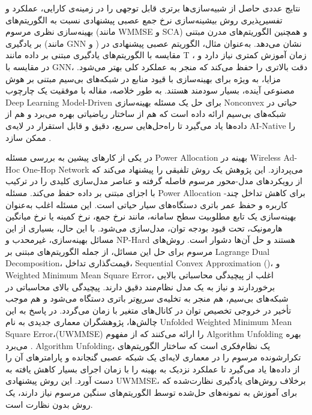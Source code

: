 نتایج عددی حاصل از شبیه‌سازی‌ها برتری قابل توجهی را در زمینه‌ی کارایی، عملکرد و تفسیرپذیری روش بیشینه‌سازی نرخ جمع عصبی پیشنهادی نسبت به الگوریتم‌های بهینه‌سازی نظری مرسوم (مانند 
\gls{WMMSE}
 و 
\gls{SCA})
 و همچنین الگوریتم‌های مدرن مبتنی بر یادگیری (مانند 
\gls{GNN}
  و 
)
 نشان می‌دهد. به‌عنوان مثال، الگوریتم عصبی پیشنهادی در مقایسه با الگوریتم‌های یادگیری مبتنی بر داده مانند T
،
   زمان آموزش کمتری نیاز دارد و در مقایسه با 
\gls{GNN}،
    دقت بالاتری را حفظ می‌کند که منجر به عملکرد کلی بهتر می‌شود.  مزایا، به ویژه برای بهینه‌سازی با قیود منابع در شبکه‌های بی‌سیم مبتنی بر هوش مصنوعی آینده، بسیار سودمند هستند.
به طور خلاصه،  مقاله با موفقیت یک چارچوب 
\gls{Deep Learning}
\gls{Model-Driven}
 برای حل یک مسئله بهینه‌سازی 
\gls{Nonconvex}
  حیاتی در شبکه‌های بی‌سیم ارائه داده است که هم از ساختار ریاضیاتی بهره می‌برد و هم از داده‌ها یاد می‌گیرد تا راه‌حل‌هایی سریع، دقیق و قابل استقرار در لایه‌ی AI-Native را ممکن سازد
\cite{NeuralSumRate}.

در یکی از کارهای پیشین به بررسی مسئله 
\gls{Power Allocation}
 بهینه در  
\gls{Wireless Ad-Hoc One-Hop Network}
  می‌پردازد. این پژوهش یک روش تلفیقی را پیشنهاد می‌کند که از رویکردهای مدل-محور مرسوم فاصله گرفته و عناصر مدل‌سازی کلیدی را در ترکیب با اجزای مبتنی بر داده حفظ می‌کند.
	مسئله 
\gls{Power Allocation}
	برای کاهش تداخل چند-کاربره و حفظ عمر باتری دستگاه‌های سیار حیاتی است. این مسئله اغلب به‌عنوان بهینه‌سازی یک تابع مطلوبیت سطح سامانه، مانند نرخ جمع، نرخ کمینه یا نرخ میانگین هارمونیک، تحت قیود بودجه توان، مدل‌سازی می‌شود. با این حال، بسیاری از این مسائل بهینه‌سازی، غیرمحدب و NP-Hard هستند و حل آن‌ها دشوار است. روش‌های مرسوم برای حل این مسائل، از جمله الگوریتم‌های مبتنی بر 
\gls{Lagrange Dual Decomposition}،
 قیمت‌گذاری تداخل، 
\gls{Sequential Convex Approximation} ()،
  و 
\gls{Weighted Minimum Mean Square Error}،
   اغلب از پیچیدگی محاسباتی بالایی برخوردارند و نیاز به یک مدل ‌نظام‌مند دقیق دارند. پیچیدگی بالای محاسباتی در شبکه‌های بی‌سیم، هم منجر به تخلیه‌ی سریع‌تر باتری دستگاه می‌شود و هم موجب تأخیر در خروجی تخصیص توان در کانال‌های متغیر با زمان می‌گردد.
	در پاسخ به این چالش‌ها، پژوهشگران معماری جدیدی به نام 
\gls{Unfolded Weighted Minimum Mean Square Error}،(UWMMSE)
	 را ارائه می‌کنند که از مفهوم 
\gls{Algorithm Unfolding}
 بهره می‌برد . 
\gls{Algorithm Unfolding}،
  یک نظام‌فکری است که ساختار الگوریتم‌های تکرارشونده مرسوم را در معماری لایه‌ای یک شبکه عصبی گنجانده و پارامترهای آن را از داده‌ها یاد می‌گیرد تا عملکرد نزدیک به بهینه را با زمان اجرای بسیار کاهش یافته به دست آورد. این روش پیشنهادی 
\gls{UWMMSE}،
   برخلاف روش‌های یادگیری نظارت‌شده که برای آموزش به نمونه‌های حل‌شده توسط الگوریتم‌های سنگین مرسوم نیاز دارند، یک روش بدون نظارت است.
   
